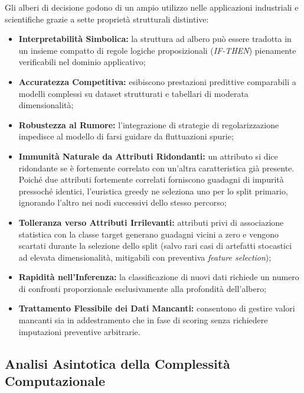 Gli alberi di decisione godono di un ampio utilizzo nelle applicazioni industriali e scientifiche grazie a sette proprietà strutturali distintive:
\begin{itemize}
    \item \textbf{Interpretabilit\`a Simbolica:} la struttura ad albero può essere tradotta in un insieme compatto di regole logiche proposizionali (\textit{IF-THEN}) pienamente verificabili nel dominio applicativo;
    \item \textbf{Accuratezza Competitiva:} esibiscono prestazioni predittive comparabili a modelli complessi su dataset strutturati e tabellari di moderata dimensionalità;
    \item \textbf{Robustezza al Rumore:} l'integrazione di strategie di regolarizzazione impedisce al modello di farsi guidare da fluttuazioni spurie;
    \item \textbf{Immunit\`a Naturale da Attributi Ridondanti:} un attributo si dice ridondante se è fortemente correlato con un'altra caratteristica già presente. Poiché due attributi fortemente correlati forniscono guadagni di impurità pressoché identici, l'euristica greedy ne seleziona uno per lo split primario, ignorando l'altro nei nodi successivi dello stesso percorso;
    \item \textbf{Tolleranza verso Attributi Irrilevanti:} attributi privi di associazione statistica con la classe target generano guadagni vicini a zero e vengono scartati durante la selezione dello split (salvo rari casi di artefatti stocastici ad elevata dimensionalità, mitigabili con preventiva \textit{feature selection});
    \item \textbf{Rapidit\`a nell'Inferenza:} la classificazione di nuovi dati richiede un numero di confronti proporzionale esclusivamente alla profondità dell'albero;
    \item \textbf{Trattamento Flessibile dei Dati Mancanti:} consentono di gestire valori mancanti sia in addestramento che in fase di scoring senza richiedere imputazioni preventive arbitrarie.
\end{itemize}

\FloatBarrier
\subsection{Analisi Asintotica della Complessit\`a Computazionale}
\label{subsec:dm-complexity-analysis}


